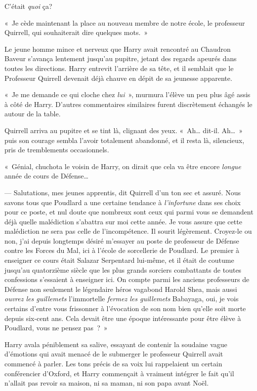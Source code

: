 C'était \emph{quoi} ça?

«~Je cède maintenant la place au nouveau membre de notre école, le professeur Quirrell, qui souhaiterait dire quelques mots.~»

Le jeune homme mince et nerveux que Harry avait rencontré au Chaudron Baveur s'avança lentement jusqu'au pupitre, jetant des regards apeurés dans toutes les directions.
Harry entrevit l'arrière de sa tête, et il semblait que le Professeur Quirrell devenait déjà chauve en dépit de sa jeunesse apparente.

«~Je me demande ce qui cloche chez \emph{lui}~», murmura l'élève un peu plus âgé assis à côté de Harry.
D'autres commentaires similaires furent discrètement échangés le autour de la table.

Quirrell arriva au pupitre et se tint là, clignant des yeux.
«~Ah… dit-il. Ah…~» puis son courage sembla l'avoir totalement abandonné, et il resta là, silencieux, pris de tremblements occasionnels.

«~Génial, chuchota le voisin de Harry, on dirait que cela va être encore \emph{longue} année de cours de Défense…

--- Salutations, mes jeunes apprentis, dit Quirrell d'un ton sec et assuré.
Nous savons tous que Poudlard a une certaine tendance à \emph{l'infortune} dans ses choix pour ce poste, et nul doute que nombreux sont ceux qui parmi vous se demandent déjà quelle malédiction s'abattra sur moi cette année.
Je vous assure que cette malédiction ne sera pas celle de l'incompétence. Il sourit légèrement.
Croyez-le ou non, j'ai depuis longtemps désiré m'essayer au poste de professeur de Défense contre les Forces du Mal, ici à l'école de sorcellerie de Poudlard.
Le premier à enseigner ce cours était Salazar Serpentard lui-même, et il était de coutume jusqu'au quatorzième siècle que les plus grands sorciers combattants de toutes confessions s'essaient à enseigner ici.
On compte parmi les anciens professeurs de Défense non seulement le légendaire héros vagabond Harold Shea, mais aussi \emph{ouvrez les guillemets} l'immortelle \emph{fermez les guillemets} Babayaga, oui, je vois certains d'entre vous frissonner à l'évocation de son nom bien qu'elle soit morte depuis six-cent ans.
Cela devait être une époque intéressante pour être élève à Poudlard, vous ne pensez pas~?~»

Harry avala péniblement sa salive, essayant de contenir la soudaine vague d'émotions qui avait menacé de le submerger le professeur Quirrell avait commencé à parler.
Les tons précis de sa voix lui rappelaient un certain conférencier d'Oxford, et Harry commençait à vraiment intégrer le fait qu'il n'allait pas revoir sa maison, ni sa maman, ni son papa avant Noël.

